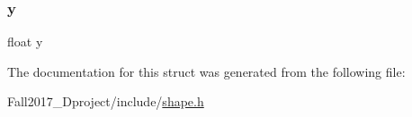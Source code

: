 \mbox{\label{structrect__s_aa4f0d3eebc3c443f9be81bf48561a217}} 
\subsubsection{\texorpdfstring{y}{y}}
{\footnotesize\ttfamily float y}



The documentation for this struct was generated from the following file\+:\begin{DoxyCompactItemize}
\item 
Fall2017\+\_\+Dproject/include/\hyperlink{shape_8h}{shape.\+h}\end{DoxyCompactItemize}
